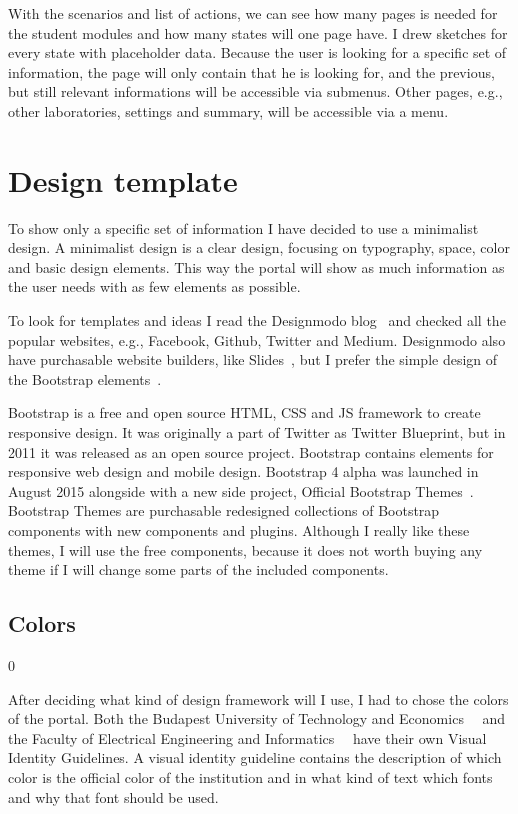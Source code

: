 With the scenarios and list of actions, we can see how many pages is needed for the student modules and how many states will one page have. I drew sketches  for every state with placeholder data. Because the user is looking for a specific set of information, the page will only contain that he is looking for, and the previous, but still relevant informations will be accessible via submenus. Other pages, e.g., other laboratories, settings and summary, will be accessible via a menu.

\section{Design template}

To show only a specific set of information I have decided to use a minimalist design. A minimalist design is a clear design, focusing on typography, space, color and basic design elements. This way the portal will show as much information as the user needs with as few elements as possible. 

To look for templates and ideas I read the Designmodo blog~\cite{Designmodo} and checked all the popular websites, e.g., Facebook, Github, Twitter and Medium. Designmodo also have purchasable website builders, like Slides~\cite{Designmodo-slides}, but I prefer the simple design of the Bootstrap elements~\cite{Bootstrap}. 

Bootstrap is a free and open source HTML, CSS and JS framework to create responsive design. It was originally a part of Twitter as Twitter Blueprint, but in 2011 it was released as an open source project. Bootstrap contains elements for responsive web design and mobile design. Bootstrap 4 alpha was launched in August 2015 alongside with a new side project, Official Bootstrap Themes~\cite{Bootstrap-themes}. Bootstrap Themes are purchasable redesigned collections of Bootstrap components with new components and plugins. Although I really like these themes, I will use the free components, because it does not worth buying any theme if I will change some parts of the included components. 

\subsection{Colors}0

After deciding what kind of design framework will I use, I had to chose the colors of the portal. Both the Budapest University of Technology and Economics~\cite{BME-Arculat}~\cite{BME-Arculat-Intranet} and the Faculty of Electrical Engineering and Informatics~\cite{VIK-Arculat}~\cite{VIK-Arculat-PDF} have their own Visual Identity Guidelines. A visual identity guideline contains the description of which color is the official color of the institution and in what kind of text which fonts and why that font should be used.

